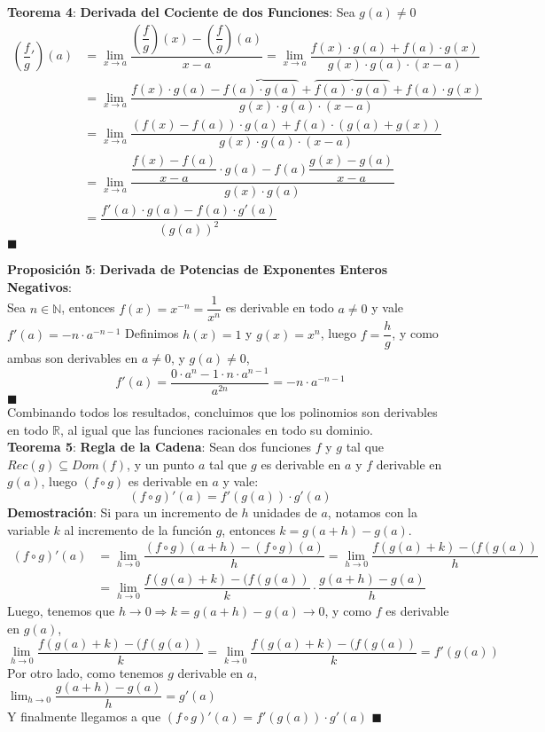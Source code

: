 \documentclass[11pt,a4paper]{article}
\newcommand*{\QEDA}{\null\nobreak\hfill\ensuremath{\blacksquare}}
\begin{document}
\noindent \textbf{Teorema 4}: \textbf{Derivada del Cociente de dos Funciones}: Sea $g(a)\not=0$
\begin{align*}
\left(\dfrac{f}{g}'\right)(a) 
& = \displaystyle{\lim_{x \to a} \dfrac{\left(\dfrac{f}{g}\right)(x) - \left(\dfrac{f}{g}\right)(a)}{x-a}}
  = \displaystyle{\lim_{x \to a} \dfrac{f(x) \cdot g(a) + f(a) \cdot g(x)}{g(x) \cdot g(a) \cdot (x-a)}}\\
& = \displaystyle{\lim_{x \to a} \dfrac{f(x) \cdot g(a) - \overbrace{f(a) \cdot g(a)} + \overbrace{f(a) \cdot g(a)} + f(a) \cdot g(x)}{g(x) \cdot g(a) \cdot (x-a)}}\\
& = \displaystyle{\lim_{x \to a} \dfrac{(f(x) - f(a)) \cdot g(a) + f(a) \cdot (g(a) + g(x))}{g(x) \cdot g(a) \cdot (x-a)}}\\
& = \displaystyle{\lim_{x \to a} \dfrac{\dfrac{f(x)-f(a)}{x-a} \cdot g(a) - f(a) \dfrac{g(x)-g(a)}{x-a}}{g(x) \cdot g(a)} }\\
& = \dfrac{f'(a) \cdot g(a) - f(a) \cdot g'(a)}{(g(a))^2}
\end{align*}
\QEDA

\noindent \textbf{Proposici\'on 5}: \textbf{Derivada de Potencias de Exponentes Enteros Negativos}: \\
Sea $n \in \mathbb{N}$, entonces $f(x)=x^{-n} = \dfrac{1}{x^n}$ es derivable en todo $a\not=0$ y vale $f'(a)=-n\cdot a^{-n-1}$
Definimos $h(x)=1$ y $g(x)=x^n$, luego $f=\dfrac{h}{g}$, y como ambas son derivables en $a\not=0$, y $g(a)\not=0$,\\
$$f'(a) = \dfrac{0\cdot a^n - 1 \cdot n\cdot a^{n-1}}{a^{2n}} = -n\cdot a^{-n-1}$$
\QEDA\\

Combinando todos los resultados, concluimos que los polinomios son derivables en todo $\mathbb{R}$, al igual que las funciones racionales en todo su dominio.\\

\noindent \textbf{Teorema 5}: \textbf{Regla de la Cadena}: Sean dos funciones $f$ y $g$ tal que $Rec(g) \subseteq Dom(f)$, y un punto $a$ tal que $g$ es derivable en $a$ y $f$ derivable en $g(a)$, luego $(f \circ g)$ es derivable en $a$ y vale: $$(f \circ g)'(a) = f'(g(a)) \cdot g'(a)$$
\textbf{Demostraci\'on}: Si para un incremento de $h$ unidades de $a$, notamos con la variable $k$ al incremento de la funci\'on $g$, entonces $k = g(a+h)-g(a)$.
\begin{align*}
(f\circ g)'(a)
& = \displaystyle{\lim_{h \to 0} \dfrac{(f \circ g)(a+h) - (f \circ g)(a)}{h}}
  = \displaystyle{\lim_{h \to 0} \dfrac{f(g(a)+k)-(f(g(a))}{h}}\\
& = \displaystyle{\lim_{h \to 0} \dfrac{f(g(a)+k)-(f(g(a))}{k} \cdot \dfrac{g(a+h)-g(a)}{h}}
\end{align*}
Luego, tenemos que $h\rightarrow0 \Rightarrow k = g(a+h)-g(a) \rightarrow 0$, y como $f$ es derivable en $g(a)$,
$$\lim_{h \to 0} \dfrac{f(g(a)+k)-(f(g(a))}{k} = \lim_{k \to 0} \dfrac{f(g(a)+k)-(f(g(a))}{k} = f'(g(a))$$
Por otro lado, como tenemos $g$ derivable en $a$, $\displaystyle{\lim_{h \to 0} \dfrac{g(a+h)-g(a)}{h} = g'(a)}$\\
Y finalmente llegamos a que $(f \circ g)'(a) = f'(g(a)) \cdot g'(a)$ \QEDA\\
\end{document}
